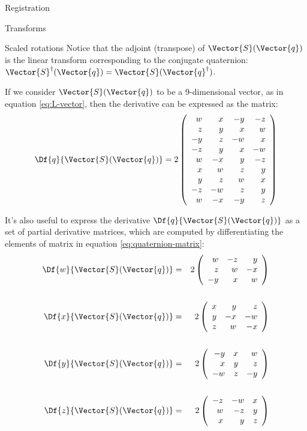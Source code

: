 \begin{plSection}{Registration}
\begin{plSection}{Transforms}
\begin{plSection}{Scaled rotations}
Notice that the adjoint (transpose) of $\Vector{S}(\Vector{q})$
is the linear transform corresponding to the conjugate quaternion:
$\Vector{S}^{\dagger}(\Vector{q}) =  \Vector{S}(\Vector{q}^{\dagger})$.

If we consider $\Vector{S}(\Vector{q})$ to be a 9-dimensional vector,
as in equation \ref{eq:L-vector},
then the derivative can be expressed as the matrix:
\begin{equation}
\label{eq:quaternion-derivative-matrix}
\Df{q}{\Vector{S}(\Vector{q})}
 = 2 \left(
\begin{array}{rrrr}
  w &  x & -y & -z \\
  z &  y &  x &  w \\
 -y &  z & -w &  x \\
 -z &  y &  x & -w \\
  w & -x &  y & -z \\
  x &  w &  z &  y \\
  y &  z &  w &  x \\
 -z & -w &  z &  y \\
  w & -x & -y &  z \\
\end{array}
\right)
\end{equation}

It's also useful to express the derivative $\Df{q}{\Vector{S}(\Vector{q})}$
as a set of partial derivative matrices,
which are computed
by differentiating the elements of matrix in equation
\ref{eq:quaternion-matrix}:
\begin{eqnarray}
\label{eq:quaternion-matrix-partial-derivatives}
\Df{w}{\Vector{S}(\Vector{q})}
& = &
2 \left(
\begin{array}{rrr}
 w & -z &  y \\
 z &  w & -x \\
-y &  x &  w
\end{array}
\right)
\\
\nonumber
\\
\Df{x}{\Vector{S}(\Vector{q})}
& = &
2 \left(
\begin{array}{rrr}
 x &  y &  z \\
 y & -x & -w \\
 z &  w & -x
\end{array}
\right)
\nonumber
\\
\nonumber
\\
\Df{y}{\Vector{S}(\Vector{q})}
& = &
2 \left(
\begin{array}{rrr}
-y &  x &  w \\
 x &  y &  z \\
-w &  z & -y
\end{array}
\right)
\nonumber
\\
\nonumber
\\
\Df{z}{\Vector{S}(\Vector{q})}
& = &
2 \left(
\begin{array}{rrr}
-z & -w &  x \\
 w & -z &  y \\
 x &  y &  z
\end{array}
\right)
\nonumber
\end{eqnarray}


\end{plSection}
\end{plSection}
\end{plSection}
